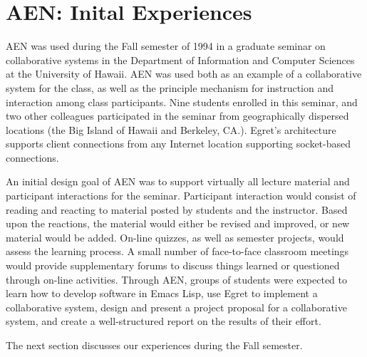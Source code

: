 

\newpage

\chapter{AEN: Inital Experiences}
\label{sec:fall94}


AEN was used during the Fall semester of 1994 in a graduate seminar on
collaborative systems in the Department of Information and Computer
Sciences at the University of Hawaii.  AEN was used both as an example of a
collaborative system for the class, as well as the principle mechanism for
instruction and interaction among class participants.  Nine students
enrolled in this seminar, and two other colleagues participated in the
seminar from geographically dispersed locations (the Big Island of Hawaii
and Berkeley, CA.).  Egret's architecture supports client connections from
any Internet location supporting socket-based connections.

An initial design goal of AEN was to support virtually all lecture material
and participant interactions for the seminar.  Participant interaction
would consist of reading and reacting to material posted by students and
the instructor.  Based upon the reactions, the material would either be
revised and improved, or new material would be added. On-line quizzes, as
well as semester projects, would assess the learning process. A small
number of face-to-face classroom meetings would provide supplementary
forums to discuss things learned or questioned through on-line activities.
Through AEN, groups of students were expected to learn how to develop
software in Emacs Lisp, use Egret to implement a collaborative system,
design and present a project proposal for a collaborative system, and
create a well-structured report on the results of their effort.

The next section discusses our experiences during the Fall semester.

